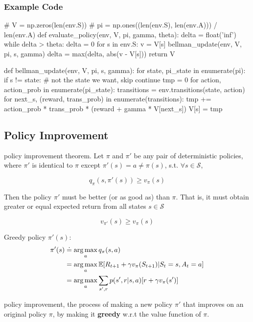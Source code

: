 \documentclass[sutton_barto_notes.tex]{subfiles}
\begin{document}
\subsubsection{Example Code}
\begin{python}
# V = np.zeros(len(env.S))
# pi = np.ones((len(env.S), len(env.A))) / len(env.A)
def evaluate_policy(env, V, pi, gamma, theta):
    delta = float('inf')
    while delta > theta:
        delta = 0
        for s in env.S:
            v = V[s]
            bellman_update(env, V, pi, s, gamma)
            delta = max(delta, abs(v - V[s]))
    return V

def bellman_update(env, V, pi, s, gamma):
    for state, pi_state in enumerate(pi):
        if s != state:  # not the state we want, skip
            continue
        tmp = 0
        for action, action_prob in enumerate(pi_state):
            transitions = env.transitions(state, action)
            for next_s, (reward, trans_prob) in enumerate(transitions):
                tmp += action_prob * trans_prob * (reward + gamma * V[next_s])
        V[s] = tmp
\end{python}

\subsection{Policy Improvement}

\begin{definition}
policy improvement theorem. Let $\pi$ and $\pi'$ be any pair of deterministic policies, where $\pi'$ is identical to $\pi$ except $\pi'(s) = a \neq \pi(s)$, s.t. $\forall s \in \mathcal{S}$,

$$ q_\pi (s,\pi'(s)) \geq v_\pi(s) $$

Then the policy $\pi'$ must be better (or as good as) than $\pi$. That is, it must obtain greater or equal expected return from all states $s \in \mathcal{S}$

$$ v_{\pi'}(s) \geq v_\pi (s) $$
\end{definition}

Greedy policy $\pi'(s)$:
\begin{align*}
\pi'(s) &\doteq \operatorname*{arg\,max}_a q_\pi (s,a) \\
&= \operatorname*{arg\,max}_a \operatorname*{\mathbb{E}} [ R_{t+1} + \gamma v_\pi (S_{t+1}) | S_t = s, A_t = a] \\
&= \operatorname*{arg\,max}_a \sum_{s',r} p(s',r|s,a)[r+\gamma v_\pi(s')]
\end{align*}

\begin{definition}
policy improvement, the process of making a new policy $\pi'$ that improves on an original policy $\pi$, by making it \textbf{greedy} w.r.t the value function of $\pi$.
\end{definition}
 
\end{document}

